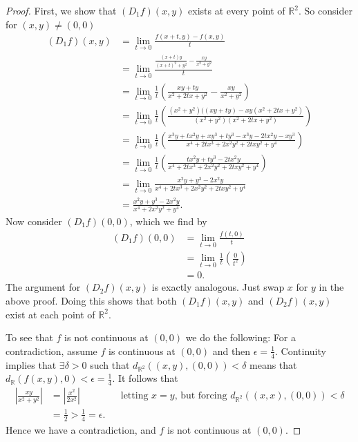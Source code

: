 \documentclass[leqno]{article}
\theoremstyle{nonumberplain}
\newtheorem{proof}{Proof}
\newcommand{\R}{\mathbb{R}}
\begin{document}
\begin{proof}
First, we show that $(D_1 f)(x,y)$ exists at every point of $\R^2$. So consider for $(x,y)\neq (0,0)$
\begin{align*}
(D_1f)(x,y)&=\lim_{t\to 0} \frac{f(x+t,y)-f(x,y)}{t}\\
&= \lim_{t\to 0} \frac{\frac{(x+t)y}{(x+t)^2+y^2}-\frac{xy}{x^2+y^2}}{t}\\
&= \lim_{t\to 0} \frac{1}{t}\left(\frac{xy+ty}{x^2+2tx+y^2}-\frac{xy}{x^2+y^2}\right)\\
&= \lim_{t\to 0} \frac{1}{t} \left( \frac{(x^2+y^2)((xy+ty)-xy(x^2+2tx+y^2)}{(x^2+y^2)(x^2+2tx+y^2)} \right)\\
&= \lim_{t\to 0} \frac{1}{t} \left( \frac{ x^3y+tx^2y+xy^3+ty^3-x^3y-2tx^2y-xy^3}{x^4+2tx^3+2x^2y^2+2txy^2+y^4} \right)\\
&= \lim_{t\to 0} \frac{1}{t} \left( \frac{ tx^2y+ty^3-2tx^2y}{x^4+2tx^3+2x^2y^2+2txy^2+y^4} \right)\\
&= \lim_{t\to 0} \frac{x^2y+y^3-2x^2y}{x^4+2tx^3+2x^2y^2+2txy^2+y^4}\\
&= \frac{x^2y+y^3-2x^2y}{x^4+2x^2y^2+y^4}.
\end{align*}
Now consider $(D_1 f)(0,0)$, which we find by
\begin{align*}
(D_1f)(0,0)&=\lim_{t\to 0} \frac{f(t,0)}{t}\\
&=\lim_{t\to 0} \frac{1}{t}\left(\frac{0}{t^2} \right)\\
&= 0.
\end{align*}
The argument for $(D_2 f)(x,y)$ is exactly analogous.  Just swap $x$ for $y$ in the above proof. Doing this shows that both $(D_1 f)(x,y)$ and $(D_2 f)(x,y)$ exist at each point of $\R^2$.

To see that $f$ is not continuous at $(0,0)$ we do the following:  For a contradiction, assume $f$ is continuous at $(0,0)$ and then $\epsilon=\frac{1}{4}$.  Continuity implies that $\exists \delta>0$ such that $d_{\R^2}((x,y),(0,0))<\delta$ means that $d_{\R}(f(x,y),0)<\epsilon=\frac{1}{4}$.  It follows that
\begin{align*}
\left| \frac{xy}{x^2+y^2} \right| &= \left| \frac{x^2}{2x^2} \right| &&\textrm{letting $x=y$, but forcing $d_{\R^2}((x,x),(0,0))<\delta$}\\
&= \frac{1}{2} >\frac{1}{4}=\epsilon.
\end{align*}
Hence we have a contradiction, and $f$ is not continuous at $(0,0)$.
\end{proof}


\pagebreak
\end{document}
